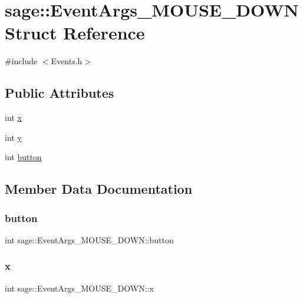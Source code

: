 \hypertarget{structsage_1_1EventArgs__MOUSE__DOWN}{}\section{sage\+::Event\+Args\+\_\+\+M\+O\+U\+S\+E\+\_\+\+D\+O\+WN Struct Reference}
\label{structsage_1_1EventArgs__MOUSE__DOWN}


{\ttfamily \#include $<$Events.\+h$>$}

\subsection*{Public Attributes}
\begin{DoxyCompactItemize}
\item 
int \mbox{\hyperlink{structsage_1_1EventArgs__MOUSE__DOWN_a59279fec9157afc40590e80067d94037}{x}}
\item 
int \mbox{\hyperlink{structsage_1_1EventArgs__MOUSE__DOWN_a71c221fa2b259e4bec5b9b6f6c4ee5ac}{y}}
\item 
int \mbox{\hyperlink{structsage_1_1EventArgs__MOUSE__DOWN_a5f7fbab41934fb5fe492750e34becd88}{button}}
\end{DoxyCompactItemize}


\subsection{Member Data Documentation}
\mbox{\label{structsage_1_1EventArgs__MOUSE__DOWN_a5f7fbab41934fb5fe492750e34becd88}} 
\subsubsection{\texorpdfstring{button}{button}}
{\footnotesize\ttfamily int sage\+::\+Event\+Args\+\_\+\+M\+O\+U\+S\+E\+\_\+\+D\+O\+W\+N\+::button}

\mbox{\label{structsage_1_1EventArgs__MOUSE__DOWN_a59279fec9157afc40590e80067d94037}} 
\subsubsection{\texorpdfstring{x}{x}}
{\footnotesize\ttfamily int sage\+::\+Event\+Args\+\_\+\+M\+O\+U\+S\+E\+\_\+\+D\+O\+W\+N\+::x}

